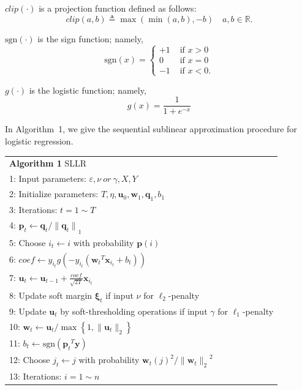 \documentclass{llncs}
\newcommand{\bw}{\mathbf{w}}
\newcommand{\bu}{\mathbf{u}}
\newcommand{\bp}{\mathbf{p}}
\newcommand{\bq}{\mathbf{q}}
\newcommand{\bxi}{\mathbf{\xi}}
\newcommand{\lc}{\left(}
\newcommand{\rc}{\right)}
\newcommand{\lj}{\lc j\rc}
\newcommand{\tspace}{\hspace*{2em}}
\newcommand{\tspaces}{\hspace*{1.5em}}
\def\sgn{\mathrm{sgn}}
\begin{document}
$clip\lc \cdot \rc$ is a projection function defined as follows:
\[
clip\lc a,b \rc \triangleq \max \lc \min \lc a,b \rc ,-b\rc \,\,\,\,\,\, a,b \in \mathbb{R}.
\]

$\sgn \lc \cdot \rc$ is the sign function; namely,
\[
\sgn \lc x \rc =
\begin{cases}
	+1 & \text{ if } x>0  \\
	0  & \text{ if } x=0  \\
	-1 & \text{ if } x<0.
\end{cases}
\]

$g\lc \cdot \rc$ is the logistic function; namely,
\[
g \lc x \rc=\frac{1}{1+e^{-x}}
\]

In Algorithm~1, we give the sequential sublinear approximation procedure for logistic regression.	
	\begin{table} [ht]
	\begin{tabular}{l}
	\hline\noalign{\smallskip}
	\textbf{Algorithm 1} SLLR \\
	\noalign{\smallskip}
	\hline
	\noalign{\smallskip}
	1:	Input parameters: $\varepsilon, \nu~or~\gamma, X, Y$ \\
	2:	Initialize parameters: $T, \eta, {\mathbf{u}}_{0}, {\bw}_{1}, {\mathbf{\bq}}_{1}, {b}_{1}$\\
	3:	Iterations: $t=1 \sim T$ \\
	4:	\tspace ${\bp}_{t}\leftarrow{\bq}_{t}/{\|{\bq}_{t}\|}_{1}$ \\
	5:  \tspace Choose ${i}_{t}\leftarrow i$ with probability $\bp(i)$ \\
	6:	\tspace $coef\leftarrow{y}_{{i}_{t}}g\lc-{y}_{{i}_{t}}\lc {{\bw}_{t}}^{T}{\mathbf{x}}_{i_t}+{b}_{t} \rc\rc$ \\
	7:	\tspace ${\bu}_{t}\leftarrow {\bu}_{t-1}+\frac{coef}{\sqrt{2T}}{\mathbf{x}}_{{i}_{t}}$ \\
    8:  \tspace Update soft margin $\bxi_t$ if input $\nu$ for $\ell_2$-penalty \\
    9:  \tspace Update $\bu_t$ by soft-thresholding operations if input $\gamma$ for $\ell_1$-penalty \\
	10:	\tspaces ${\bw}_{t}\leftarrow {\bu}_{t}/\max \left\{1,\|{\bu}_{t}\|_2 \right\}$ \\
    11: \tspaces ${b}_{t}\leftarrow \sgn\lc {{\bp}_{t}}^{T}\mathbf{y}\rc$ \\
	12:	\tspaces Choose ${j}_{t}\leftarrow j$ with probability ${{\bw}_{t}\lj}^{2}/{\|{\bw}_{t}\|_2}^{2} $ \\
	13:	\tspaces Iterations: $i=1 \sim n$ \\

\end{tabular}
\end{table}
\end{document}
